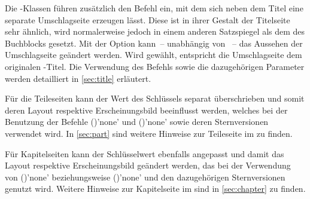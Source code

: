 \begin{Declaration*}{}
\begin{Declaration*}{}
\begin{Declaration*}{}
\begin{Declaration}[%
  v2.02;%
  v2.03!\Option{cdcover=bicolor}:%
    Farbeinsatz nur im Kopf mit farbig abgesetztem Querbalken;
  v2.03!\Option{cdcover=fullcolor}:%
    voller Farbeinsatz mit farbig abgesetztem Querbalken;
  v2.04!\Option{cdcover=barcolor}:nur farbig abgesetzter Querbalken;%
]{}
\printdeclarationlist%
%
%
Die \TUDScript-Klassen führen zusätzlich den Befehl  ein, mit 
dem sich neben dem Titel eine separate Umschlagseite erzeugen lässt. Diese ist 
in ihrer Gestalt der Titelseite sehr ähnlich, wird normalerweise jedoch in 
einem anderen Satzspiegel als dem des Buchblocks gesetzt. Mit der Option 
 kann~-- unabhängig von ~-- das Aussehen der 
Umschlagseite geändert werden. Wird  gewählt, entspricht 
die Umschlagseite dem originalen \KOMAScript-Titel. Die Verwendung des Befehls 
 sowie die dazugehörigen Parameter werden detailliert in 
\autoref{sec:title} erläutert.
\end{Declaration}

\begin{Declaration}[%
  v2.03!\Option{cdpart=bicolor}:%
    Farbeinsatz nur im Kopf mit farbig abgesetztem Querbalken;
  v2.03!\Option{cdpart=fullcolor}:%
    voller Farbeinsatz mit farbig abgesetztem Querbalken;
  v2.04!\Option{cdpart=barcolor}:nur farbig abgesetzter Querbalken;%
]{}
\printdeclarationlist%
%
%
Für die Teileseiten kann der Wert des Schlüssels  separat 
überschrieben und somit deren Layout respektive Erscheinungsbild beeinflusst 
werden, welches bei der Benutzung der Befehle 
()'none' und 
()'none' sowie deren Sternversionen 
verwendet wird. In \autoref{sec:part} sind weitere Hinweise zur Teileseite im 
\CD zu finden.
\end{Declaration}

\begin{Declaration}[%
  v2.03!\Option{cdchapter=bicolor}:%
    Farbeinsatz nur im Kopf mit farbig abgesetztem Querbalken;
  v2.03!\Option{cdchapter=fullcolor}:%
    voller Farbeinsatz mit farbig abgesetztem Querbalken;
  v2.04!\Option{cdchapter=barcolor}:nur farbig abgesetzter Querbalken;%
]{}
\printdeclarationlist%
%
%
Für Kapitelseiten kann der Schlüsselwert  ebenfalls angepasst 
und damit das Layout respektive Erscheinungsbild geändert werden, das bei der 
Verwendung von ()'none' beziehungsweise 
()'none' und den dazugehörigen 
Sternversionen genutzt wird. Weitere Hinweise zur Kapitelseite im \CD sind in 
\autoref{sec:chapter} zu finden.
\end{Declaration}


\end{Declaration*}
\end{Declaration*}
\end{Declaration*}
